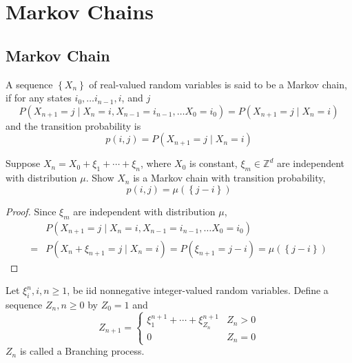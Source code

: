 \chapter{Markov Chains}

\section{Markov Chain}

\begin{definition}
	A sequence \(\left\{X_{n}\right\}\) of real-valued random variables  is said to be a Markov chain, if for any states \(i_{0},\ldots i_{n-1},i\), and \(j\)
	\begin{equation}
		P\left(X_{n+1}=j\mid X_{n}=i,X_{n-1}=i_{n-1},\ldots X_{0}=i_{0}\right)=P\left(X_{n+1}=j\mid X_{n}=i\right)
	\end{equation}
	and the transition probability is
	\begin{equation}
		p(i,j)=P\left(X_{n+1}=j\mid X_{n}=i\right)
	\end{equation}
\end{definition}

\begin{example}
	Suppose \(X_{n}=X_{0}+\xi_{1}+\cdots+\xi_{n}\), where \(X_{0}\) is constant, \(\xi_{m}\in\mathbb{Z}^{d}\) are independent with distribution \(\mu\). Show \(X_{n}\) is a Markov chain with transition probability,
	\begin{equation*}
		p\left(i,j\right)=\mu\left(\left\{j-i\right\}\right)
	\end{equation*}
\end{example}

\begin{proof}
	Since \(\xi_{m}\) are independent with distribution \(\mu\),
	\begin{equation*}
		\begin{aligned}
			  & P\left(X_{n+1}=j\mid X_{n}=i,X_{n-1}=i_{n-1},\ldots X_{0}=i_{0}\right)                                     \\
			= & P\left(X_{n}+\xi_{n+1}=j\mid X_{n}=i\right)=P\left(\xi_{n+1}=j-i\right)=\mu\left(\left\{j-i\right\}\right)
		\end{aligned}
	\end{equation*}
\end{proof}

\begin{definition}
	Let \(\xi_{i}^{n},i,n\geq 1\), be iid nonnegative integer-valued random variables. Define a sequence \(Z_{n},n\geq 0\) by \(Z_{0}=1\) and
	\begin{equation}
		Z_{n+1}=\left\{\begin{array}{ll}
			\xi_{1}^{n+1}+\cdots+\xi_{Z_{n}}^{n+1} & Z_{n}>0 \\
			0                                      & Z_{n}=0
		\end{array}\right.
	\end{equation}
	\(Z_{n}\) is called a Branching process.
\end{definition}

